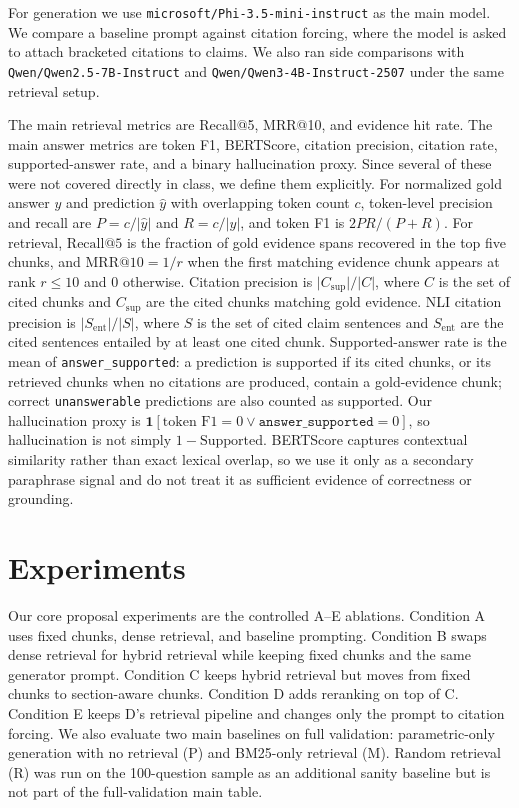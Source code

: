 \documentclass[11pt]{article}
\begin{document}
For generation we use \texttt{microsoft/Phi-3.5-mini-instruct} \citep{microsoft2024phi3} as the main model. We compare a baseline prompt against citation forcing, where the model is asked to attach bracketed citations to claims. We also ran side comparisons with \texttt{Qwen/Qwen2.5-7B-Instruct} \citep{qwen2024qwen25} and \texttt{Qwen/Qwen3-4B-Instruct-2507} \citep{qwen2025qwen3} under the same retrieval setup.

The main retrieval metrics are Recall@5, MRR@10, and evidence hit rate. The main answer metrics are token F1, BERTScore, citation precision, citation rate, supported-answer rate, and a binary hallucination proxy. Since several of these were not covered directly in class, we define them explicitly. For normalized gold answer $y$ and prediction $\hat{y}$ with overlapping token count $c$, token-level precision and recall are $P=c/|\hat{y}|$ and $R=c/|y|$, and token F1 is $2PR/(P+R)$. For retrieval, $\mathrm{Recall@5}$ is the fraction of gold evidence spans recovered in the top five chunks, and $\mathrm{MRR@10}=1/r$ when the first matching evidence chunk appears at rank $r\le 10$ and $0$ otherwise. Citation precision is $\lvert C_{\mathrm{sup}}\rvert / \lvert C\rvert$, where $C$ is the set of cited chunks and $C_{\mathrm{sup}}$ are the cited chunks matching gold evidence. NLI citation precision is $\lvert S_{\mathrm{ent}}\rvert / \lvert S\rvert$, where $S$ is the set of cited claim sentences and $S_{\mathrm{ent}}$ are the cited sentences entailed by at least one cited chunk. Supported-answer rate is the mean of \texttt{answer\_supported}: a prediction is supported if its cited chunks, or its retrieved chunks when no citations are produced, contain a gold-evidence chunk; correct \texttt{unanswerable} predictions are also counted as supported. Our hallucination proxy is $\mathbf{1}[\text{token F1}=0 \lor \texttt{answer\_supported}=0]$, so hallucination is not simply $1-\text{Supported}$. BERTScore captures contextual similarity rather than exact lexical overlap, so we use it only as a secondary paraphrase signal and do not treat it as sufficient evidence of correctness or grounding.

\section{Experiments}

Our core proposal experiments are the controlled A--E ablations. Condition A uses fixed chunks, dense retrieval, and baseline prompting. Condition B swaps dense retrieval for hybrid retrieval while keeping fixed chunks and the same generator prompt. Condition C keeps hybrid retrieval but moves from fixed chunks to section-aware chunks. Condition D adds reranking on top of C. Condition E keeps D's retrieval pipeline and changes only the prompt to citation forcing. We also evaluate two main baselines on full validation: parametric-only generation with no retrieval (P) and BM25-only retrieval (M). Random retrieval (R) was run on the 100-question sample as an additional sanity baseline but is not part of the full-validation main table.
\end{document}
